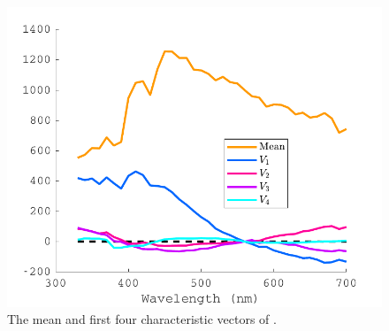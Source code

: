 \begin{figure}[htbp]
 \includegraphics[max width=\textwidth]{figs/LitRev/Judd.pdf}
 \caption{The mean and first four characteristic vectors of \citet{judd_spectral_1964}.}
 \label{fig:Judd}
\end{figure} 